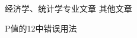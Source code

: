 \begin{cventries}
    \cventry
    {经济学、统计学专业文章} %
    {其他文章} %
    {} %
    {} %
    {
      \begin{cvitems} %
        \item {P值的12中错误用法}
      \end{cvitems}
    }

\end{cventries}
